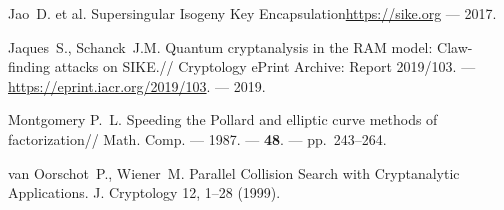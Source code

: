 \documentclass[a4paper,12pt]{article}
\theoremstyle{definition}
\begin{document}
\begin{thebibliography}{1}
  

  Jao~D. et al. \newblock Supersingular Isogeny Key Encapsulation\newblock \url{https://sike.org} --- 2017.


Jaques~S.,  Schanck~J.M.
\newblock Quantum cryptanalysis in the RAM model: Claw-finding attacks on SIKE.//
 Cryptology ePrint Archive: Report 2019/103. ---  \newblock \url{https://eprint.iacr.org/2019/103}. --- 2019.

 
 

 




Montgomery P.~L.
\newblock
\newblock Speeding the {P}ollard and elliptic curve methods of factorization//
  Math. Comp.
\newblock --- 1987. --- {\bf 48}. --- pp.~243--264.


 van Oorschot~P., Wiener~M. Parallel Collision Search with Cryptanalytic Applications. J. Cryptology 12, 1–28 (1999).




\end{thebibliography}
\end{document}
